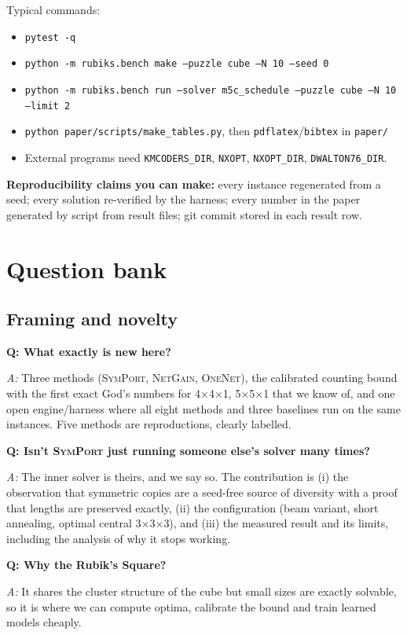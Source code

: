 \documentclass[10.5pt,a4paper]{article}
\newcommand{\Cu}[1]{#1$\times$#1$\times$#1}
\newcommand{\Sq}[1]{#1$\times$#1$\times$1}
\newcommand{\M}[1]{\textsc{#1}}
\newcommand{\Q}[1]{\par\smallskip\textbf{Q: #1}\par}
\newcommand{\A}{\textit{A:} }
\begin{document}
Typical commands:
\begin{itemize}
\item \texttt{pytest -q}
\item \texttt{python -m rubiks.bench make --puzzle cube --N 10 --seed 0}
\item \texttt{python -m rubiks.bench run --solver m5c\_schedule --puzzle cube --N 10 --limit 2}
\item \texttt{python paper/scripts/make\_tables.py}, then \texttt{pdflatex}/\texttt{bibtex} in \texttt{paper/}
\item External programs need \texttt{KMCODERS\_DIR}, \texttt{NXOPT}, \texttt{NXOPT\_DIR}, \texttt{DWALTON76\_DIR}.
\end{itemize}

\textbf{Reproducibility claims you can make:} every instance regenerated from a seed; every solution re-verified by the harness;
every number in the paper generated by script from result files; git commit stored in each result row.

\section{Question bank}

\subsection{Framing and novelty}
\Q{What exactly is new here?} \A Three methods (\M{SymPort}, \M{NetGain}, \M{OneNet}), the calibrated counting bound with the first
exact God's numbers for \Sq{4}, \Sq{5} that we know of, and one open engine/harness where all eight methods and three baselines run
on the same instances. Five methods are reproductions, clearly labelled.
\Q{Isn't \M{SymPort} just running someone else's solver many times?} \A The inner solver is theirs, and we say so. The contribution is
(i) the observation that symmetric copies are a seed-free source of diversity with a proof that lengths are preserved exactly, (ii) the
configuration (beam variant, short annealing, optimal central \Cu{3}), and (iii) the measured result and its limits, including the
analysis of why it stops working.
\Q{Why the Rubik's Square?} \A It shares the cluster structure of the cube but small sizes are exactly solvable, so it is where we can
compute optima, calibrate the bound and train learned models cheaply.
\end{document}
